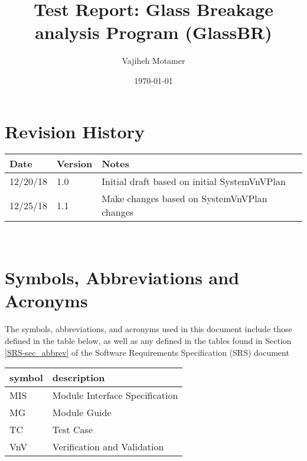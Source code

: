 \documentclass[12pt, titlepage]{article}
\newcommand{\progname}{GlassBR}
\begin{document}
	
	\title{Test Report: Glass Breakage analysis Program (\progname{})} 
	\author{Vajiheh Motamer}
	\date{\today}
	
	\maketitle
	
	
	\section{Revision History}
	
	\begin{tabularx}{\textwidth}{p{3cm}p{2cm}X}
		\toprule {\bf Date} & {\bf Version} & {\bf Notes}\\
		\midrule
		12/20/18 & 1.0 & Initial draft based on initial SystemVnVPlan\\
		12/25/18 & 1.1 & Make changes based on SystemVnVPlan changes\\
		\bottomrule
	\end{tabularx}
	
	~\newpage
	
	\section{Symbols, Abbreviations and Acronyms}
	
	The symbols, abbreviations, and acronyms used in this document include those 
	defined in the table below, as well as any defined in the tables found in 
	Section \ref{SRS-sec_abbrev} of the Software Requirements Specification (SRS) 
	document
	\newline
	
	\renewcommand{\arraystretch}{1.2}
	\begin{tabular}{l l} 
		\toprule		
		\textbf{symbol} & \textbf{description}\\
		\midrule
		MIS & Module Interface Specification\\
		MG & Module Guide\\
		TC & Test Case\\
		VnV & Verification and Validation\\
		\bottomrule
	\end{tabular}\\
	
	\newpage
	
	\tableofcontents
	
	\listoftables %
	
\end{document}
